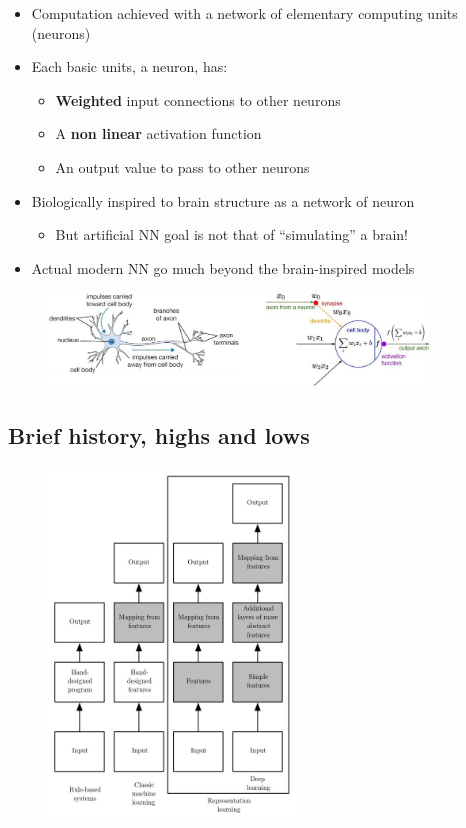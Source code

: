 \begin{itemize}
	\item Computation achieved with a network of elementary computing units (neurons) 
	\item Each basic units, a neuron, has:
	\begin{itemize}
		\item \textbf{Weighted} input connections to other neurons
		\item A \textbf{non linear} activation function
		\item An output value to pass to other neurons
	\end{itemize}
	\item Biologically inspired to brain structure as a network of neuron
	\begin{itemize}
		\item But artificial NN goal is not that of “simulating” a brain!
	\end{itemize}
	\item Actual modern NN go much beyond the brain-inspired models
\end{itemize}

\begin{figure}[ht]
	\centering
	\includegraphics[width=0.9\textwidth]{figure_ml/model.png}
\end{figure}
\FloatBarrier

\subsection{Brief history, highs and lows}

\begin{figure}
	\includegraphics[width=0.6\textwidth]{figure_ml/history.png}
\end{figure} 

